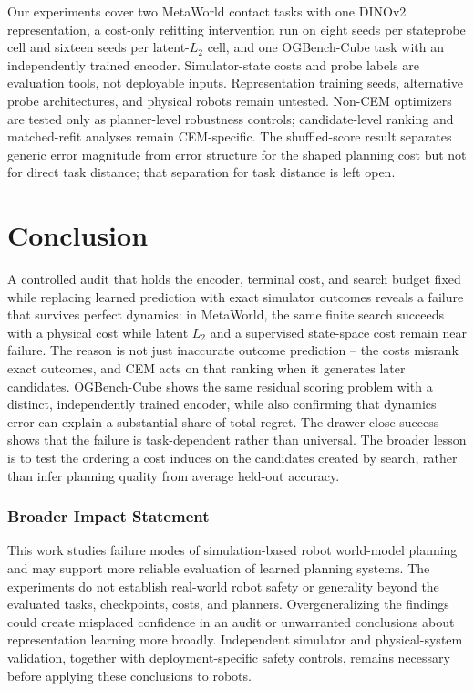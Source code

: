 \documentclass[10pt]{article}
\begin{document}
Our experiments cover two MetaWorld contact tasks with one DINOv2
representation, a cost-only refitting intervention run on eight seeds per
stateprobe cell and sixteen seeds per latent-$L_2$ cell, and one OGBench-Cube
task with an independently trained encoder.
Simulator-state costs and probe labels are evaluation tools, not deployable
inputs. Representation training seeds, alternative probe architectures, and
physical robots remain untested. Non-CEM optimizers are tested only as
planner-level robustness controls; candidate-level ranking and matched-refit
analyses remain CEM-specific. The shuffled-score result separates generic
error magnitude from error structure for the shaped planning cost but not for
direct task distance; that separation for task distance is left open.

\section{Conclusion}

A controlled audit that holds the encoder, terminal cost, and search budget
fixed while replacing learned prediction with exact simulator outcomes
reveals a failure that survives perfect dynamics: in MetaWorld, the same
finite search succeeds with a physical cost while latent $L_2$ and a
supervised state-space cost remain near failure. The reason is not just
inaccurate outcome prediction -- the costs misrank exact outcomes, and CEM
acts on that ranking when it generates later candidates. OGBench-Cube shows
the same residual scoring problem with a distinct, independently trained
encoder, while also confirming that dynamics error can explain a substantial
share of total regret. The drawer-close success shows that the failure is
task-dependent rather than universal. The broader lesson is to test the
ordering a cost induces on the candidates created by search, rather than
infer planning quality from average held-out accuracy.

\subsubsection*{Broader Impact Statement}
This work studies failure modes of simulation-based robot world-model planning
and may support more reliable evaluation of learned planning systems. The
experiments do not establish real-world robot safety or generality beyond the
evaluated tasks, checkpoints, costs, and planners. Overgeneralizing the
findings could create misplaced confidence in an audit or unwarranted
conclusions about representation learning more broadly. Independent simulator
and physical-system validation, together with deployment-specific safety
controls, remains necessary before applying these conclusions to robots.
\end{document}
